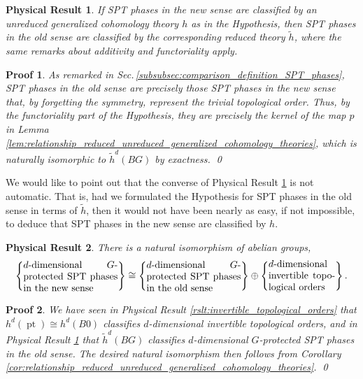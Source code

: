 \documentclass[sort&compress]{elsarticle}
\theoremstyle{theoremstyle}
\theoremstyle{framedtheoremstyle}
\newtheorem{rslt}{Physical Result}
\theoremstyle{definitionstyle}
\theoremstyle{definitionstyle}
\theoremstyle{definitionstyle}
\theoremstyle{definitionstyle}
\theoremstyle{nameddefinitionstyle}
\theoremstyle{framednameddefinitionstyle}
\theoremstyle{proofstyle}
\newtheorem{pf}{Proof}
\theoremstyle{definitionstyle}
\newcommand{\isomorphic}{\cong}
\newcommand{\paren}[1]{\left( #1 \right)}
\newcommand{\braces}[1]{\left\{ #1 \right\}}
\DeclareMathOperator{\pt}{pt}
\begin{document}
\begin{framed}\begin{rslt}\label{rslt:SPT_phases_old_sense}
If SPT phases in the new sense are classified by an unreduced generalized cohomology theory $h$ as in the Hypothesis, then SPT phases in the old sense are classified by the corresponding reduced theory $\tilde h$, where the same remarks about additivity and functoriality apply.
\end{rslt}\end{framed}

\begin{pf}
As remarked in Sec.\,\ref{subsubsec:comparison_definition_SPT_phases}, SPT phases in the old sense are precisely those SPT phases in the new sense that, by forgetting the symmetry, represent the trivial topological order. Thus, by the functoriality part of the Hypothesis, they are precisely the kernel of the map $p$ in Lemma \ref{lem:relationship_reduced_unreduced_generalized_cohomology_theories}, which is naturally isomorphic to $\tilde h^d\paren{BG}$ by exactness.
\qed\end{pf}

We would like to point out that the converse of Physical Result \ref{rslt:SPT_phases_old_sense} is not automatic. That is, had we formulated the Hypothesis for SPT phases in the old sense in terms of $\tilde h$, then it would not have been nearly as easy, if not impossible, to deduce that SPT phases in the new sense are classified by $h$.

\begin{framed}\begin{rslt}\label{rslt:reduced_unreduced_isomorphism}
There is a natural isomorphism of abelian groups,
\begin{eqnarray}
\braces{\parbox{3.4cm}{$d$-dimensional $G$-protected SPT phases in the new sense}} 
\isomorphic
\braces{\parbox{3.4cm}{$d$-dimensional $G$-protected SPT phases in the old sense}} 
\oplus
\braces{\parbox{2.4cm}{$d$-dimensional invertible topological orders}}.
\end{eqnarray}
\end{rslt}\end{framed}

\begin{pf}
We have seen in Physical Result \ref{rslt:invertible_topological_orders} that $h^d\paren{\pt} \isomorphic h^d\paren{B0}$ classifies $d$-dimensional invertible topological orders, and in Physical Result \ref{rslt:SPT_phases_old_sense} that $\tilde h^d\paren{BG}$ classifies $d$-dimensional $G$-protected SPT phases in the old sense. The desired natural isomorphism then follows from Corollary \ref{cor:relationship_reduced_unreduced_generalized_cohomology_theories}.
\qed\end{pf}
\end{document}
